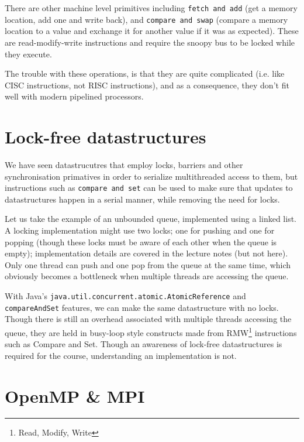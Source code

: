 There are other machine level primitives including \texttt{fetch and add} (get a
memory location, add one and write back), and \texttt{compare and swap} (compare
a memory location to a value and exchange it for another value if it was as
expected). These are read-modify-write instructions and require the snoopy bus
to be locked while they execute.

The trouble with these operations, is that they are quite complicated (i.e. like
CISC instructions, not RISC instructions), and as a consequence, they don't fit
well with modern pipelined processors.



\section{Lock-free datastructures}

We have seen datastrucutres that employ locks, barriers and other
synchronisation primatives in order to serialize multithreaded access
to them, but instructions such as \texttt{compare and set} can be used
to make sure that updates to datastructures happen in a serial manner,
while removing the need for locks.

Let us take the example of an unbounded queue, implemented using a
linked list. A locking implementation might use two locks; one for
pushing and one for popping (though these locks must be aware of each
other when the queue is empty); implementation details are covered in
the lecture notes (but not here). Only one thread can push and one pop
from the queue at the same time, which obviously becomes a bottleneck
when multiple threads are accessing the queue.

With Java's \texttt{java.util.concurrent.atomic.AtomicReference}
and \texttt{compareAndSet} features, we can make the same
datastructure with no locks. Though there is still an overhead
associated with multiple threads accessing the queue, they are held in
busy-loop style constructs made from RMW\footnote{Read, Modify, Write}
instructions such as Compare and Set. Though an awareness of lock-free
datastructures is required for the course, understanding an
implementation is not.


\section{OpenMP \& MPI}

